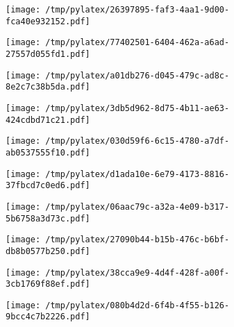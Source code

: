 \documentclass{article}
\begin{document}
\begin{figure}[htbp]
\begin{subfigure}[b]{.3\linewidth}
\texttt{[image: /tmp/pylatex/26397895-faf3-4aa1-9d00-fca40e932152.pdf]}
\end{subfigure}
\begin{subfigure}[b]{.3\linewidth}
\texttt{[image: /tmp/pylatex/77402501-6404-462a-a6ad-27557d055fd1.pdf]}
\end{subfigure}
\begin{subfigure}[b]{.3\linewidth}
\texttt{[image: /tmp/pylatex/a01db276-d045-479c-ad8c-8e2c7c38b5da.pdf]}
\end{subfigure}
\begin{subfigure}[b]{.3\linewidth}
\texttt{[image: /tmp/pylatex/3db5d962-8d75-4b11-ae63-424cdbd71c21.pdf]}
\end{subfigure}
\begin{subfigure}[b]{.3\linewidth}
\texttt{[image: /tmp/pylatex/030d59f6-6c15-4780-a7df-ab0537555f10.pdf]}
\end{subfigure}
\begin{subfigure}[b]{.3\linewidth}
\texttt{[image: /tmp/pylatex/d1ada10e-6e79-4173-8816-37fbcd7c0ed6.pdf]}
\end{subfigure}
\begin{subfigure}[b]{.3\linewidth}
\texttt{[image: /tmp/pylatex/06aac79c-a32a-4e09-b317-5b6758a3d73c.pdf]}
\end{subfigure}
\begin{subfigure}[b]{.3\linewidth}
\texttt{[image: /tmp/pylatex/27090b44-b15b-476c-b6bf-db8b0577b250.pdf]}
\end{subfigure}
\begin{subfigure}[b]{.3\linewidth}
\texttt{[image: /tmp/pylatex/38cca9e9-4d4f-428f-a00f-3cb1769f88ef.pdf]}
\end{subfigure}
\begin{subfigure}[b]{.3\linewidth}
\texttt{[image: /tmp/pylatex/080b4d2d-6f4b-4f55-b126-9bcc4c7b2226.pdf]}
\end{subfigure}
\end{figure}
\end{document}
